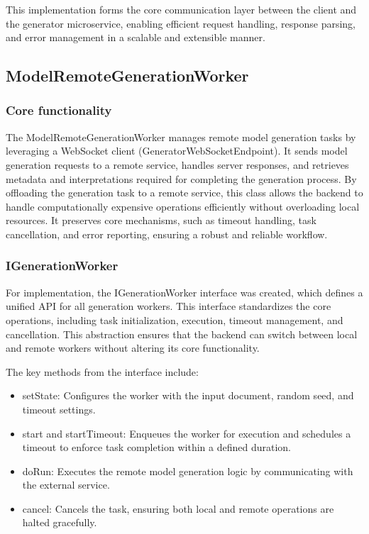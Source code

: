			This implementation forms the core communication layer between the client and the generator microservice, enabling efficient 
			request handling, response parsing, and error management in a scalable and extensible manner.


		\subsection{ModelRemoteGenerationWorker}
			\subsubsection{Core functionality}
				The ModelRemoteGenerationWorker manages remote model generation tasks by leveraging a WebSocket client (GeneratorWebSocketEndpoint). 
				It sends model generation requests to a remote service, handles server responses, and retrieves metadata and interpretations required 
				for completing the generation process.
				By offloading the generation task to a remote service, this class allows the backend to handle computationally expensive operations 
				efficiently without overloading local resources. It preserves core mechanisms, such as timeout handling, task cancellation, 
				and error reporting, ensuring a robust and reliable workflow.

			\subsubsection{IGenerationWorker}
				For implementation, the IGenerationWorker interface was created, which defines a unified API for all generation workers. 
				This interface standardizes the core operations, including task initialization, execution, timeout management, and cancellation.
				This abstraction ensures that the backend can switch between local and remote workers without altering its core functionality.

				The key methods from the interface include:
				\begin{itemize}
					\item setState: Configures the worker with the input document, random seed, and timeout settings.
					\item start and startTimeout: Enqueues the worker for execution and schedules a timeout to enforce task completion within a defined duration.
					\item doRun: Executes the remote model generation logic by communicating with the external service.
					\item \label{workercancel}cancel: Cancels the task, ensuring both local and remote operations are halted gracefully.
				\end{itemize}

